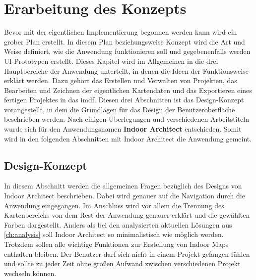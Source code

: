 \chapter{Erarbeitung des Konzepts}\label{ch:conception}
Bevor mit der eigentlichen Implementierung begonnen werden kann wird ein grober Plan erstellt.
In diesem Plan beziehungsweise Konzept wird die Art und Weise definiert, wie die Anwendung funktionieren soll und gegebenenfalls werden UI-Prototypen erstellt.\pbreak%
%
Dieses Kapitel wird im Allgemeinen in die drei Hauptbereiche der Anwendung unterteilt, in denen die Ideen der Funktionsweise erklärt werden.
Dazu gehört das Erstellen und Verwalten von Projekten, das Bearbeiten und Zeichnen der eigentlichen Kartendaten und das Exportieren eines fertigen Projektes in das \acl{imdf}.
Diesen drei Abschnitten ist das Design-Konzept vorangestellt, in dem die Grundlagen für das Design der Benutzeroberfläche beschrieben werden.\pbreak%
%
Nach einigen Überlegungen und verschiedenen Arbeitstiteln wurde sich für den Anwendungsnamen \textbf{Indoor Architect} entschieden.
Somit wird in den folgenden Abschnitten mit Indoor Architect die Anwendung gemeint.

\section{Design-Konzept}
In diesem Abschnitt werden die allgemeinen Fragen bezüglich des Designs von Indoor Architect beschrieben.
Dabei wird genauer auf die Navigation durch die Anwendung eingegangen.
Im Anschluss wird vor allem die Trennung des Kartenbereichs von dem Rest der Anwendung genauer erklärt und die gewählten Farben dargestellt.\pbreak%
%
Anders als bei den analysierten aktuellen Lösungen aus \autoref{ch:analysis} soll Indoor Architect so minimalistisch wie möglich werden.
Trotzdem sollen alle wichtige Funktionen zur Erstellung von Indoor Maps enthalten bleiben.
Der Benutzer darf sich nicht in einem Projekt gefangen fühlen und sollte zu jeder Zeit ohne großen Aufwand zwischen verschiedenen Projekt wechseln können.

